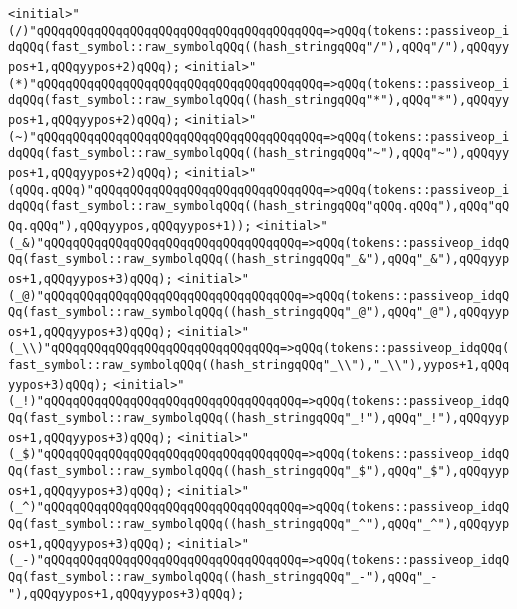 \verb|<initial>"(/)"qQQqqQQqqQQqqQQqqQQqqQQqqQQqqQQqqQQqqQQq=>qQQq(tokens::passiveop_idqQQq(fast_symbol::raw_symbolqQQq((hash_stringqQQq"/"),qQQq"/"),qQQqyypos+1,qQQqyypos+2)qQQq);|\newline
\verb|<initial>"(*)"qQQqqQQqqQQqqQQqqQQqqQQqqQQqqQQqqQQqqQQq=>qQQq(tokens::passiveop_idqQQq(fast_symbol::raw_symbolqQQq((hash_stringqQQq"*"),qQQq"*"),qQQqyypos+1,qQQqyypos+2)qQQq);|\newline
\verb|<initial>"(~)"qQQqqQQqqQQqqQQqqQQqqQQqqQQqqQQqqQQqqQQq=>qQQq(tokens::passiveop_idqQQq(fast_symbol::raw_symbolqQQq((hash_stringqQQq"~"),qQQq"~"),qQQqyypos+1,qQQqyypos+2)qQQq);|\newline
\verb|<initial>"(qQQq.qQQq)"qQQqqQQqqQQqqQQqqQQqqQQqqQQqqQQq=>qQQq(tokens::passiveop_idqQQq(fast_symbol::raw_symbolqQQq((hash_stringqQQq"qQQq.qQQq"),qQQq"qQQq.qQQq"),qQQqyypos,qQQqyypos+1));|\newline
\verb|<initial>"(_&)"qQQqqQQqqQQqqQQqqQQqqQQqqQQqqQQqqQQq=>qQQq(tokens::passiveop_idqQQq(fast_symbol::raw_symbolqQQq((hash_stringqQQq"_&"),qQQq"_&"),qQQqyypos+1,qQQqyypos+3)qQQq);|\newline
\verb|<initial>"(_@)"qQQqqQQqqQQqqQQqqQQqqQQqqQQqqQQqqQQq=>qQQq(tokens::passiveop_idqQQq(fast_symbol::raw_symbolqQQq((hash_stringqQQq"_@"),qQQq"_@"),qQQqyypos+1,qQQqyypos+3)qQQq);|\newline
\verb|<initial>"(_\\)"qQQqqQQqqQQqqQQqqQQqqQQqqQQqqQQq=>qQQq(tokens::passiveop_idqQQq(fast_symbol::raw_symbolqQQq((hash_stringqQQq"_\\"),"_\\"),yypos+1,qQQqyypos+3)qQQq);|\newline
\verb|<initial>"(_!)"qQQqqQQqqQQqqQQqqQQqqQQqqQQqqQQqqQQq=>qQQq(tokens::passiveop_idqQQq(fast_symbol::raw_symbolqQQq((hash_stringqQQq"_!"),qQQq"_!"),qQQqyypos+1,qQQqyypos+3)qQQq);|\newline
\verb|<initial>"(_$)"qQQqqQQqqQQqqQQqqQQqqQQqqQQqqQQqqQQq=>qQQq(tokens::passiveop_idqQQq(fast_symbol::raw_symbolqQQq((hash_stringqQQq"_$"),qQQq"_$"),qQQqyypos+1,qQQqyypos+3)qQQq);|\newline
\verb|<initial>"(_^)"qQQqqQQqqQQqqQQqqQQqqQQqqQQqqQQqqQQq=>qQQq(tokens::passiveop_idqQQq(fast_symbol::raw_symbolqQQq((hash_stringqQQq"_^"),qQQq"_^"),qQQqyypos+1,qQQqyypos+3)qQQq);|\newline
\verb|<initial>"(_-)"qQQqqQQqqQQqqQQqqQQqqQQqqQQqqQQqqQQq=>qQQq(tokens::passiveop_idqQQq(fast_symbol::raw_symbolqQQq((hash_stringqQQq"_-"),qQQq"_-"),qQQqyypos+1,qQQqyypos+3)qQQq);|\newline

